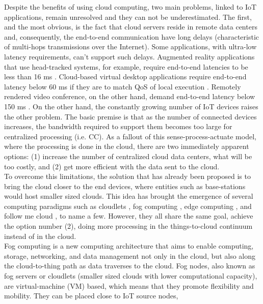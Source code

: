 \noindent\tab Despite the benefits of using cloud computing, two main problems, linked to IoT applications, remain unresolved and they can not be underestimated. The first, and the most obvious, is the fact that cloud servers reside in remote data centers and, consequently, the end-to-end communication have long delays (characteristic of multi-hops transmissions over the Internet). Some applications, with ultra-low latency requirements, can't support such delays. Augmented reality applications that use head-tracked systems, for example, require end-to-end latencies to be less than 16 ms \cite{ellis2004generalizeability}. Cloud-based virtual desktop applications require end-to-end latency below 60 ms if they are to match QoS of local execution \cite{taylor2015virtual}. Remotely rendered video conference, on the other hand, demand end-to-end latency below 150 ms \cite{szigeti2005end}. On the other hand, the constantly growing number of IoT devices raises the other problem. The basic premise is that as the number of connected devices increases, the bandwidth required to support them becomes too large for centralized processing (i.e. CC). As a fallout of this sense-process-actuate model, where the processing is done in the cloud, there are two immediately apparent options: (1) increase the number of centralized cloud data centers, what will be too costly, and (2) get more efficient with the data sent to the cloud.\\
\noindent\tab To overcome this limitations, the solution that has already been proposed is to bring the cloud closer to the end devices, where entities such as base-stations would host smaller sized clouds. This idea has brought the emergence of several computing paradigms such as cloudlets \cite{satyanarayanan2013cloudlets}, fog computing \cite{bonomi2012fog}, edge computing \cite{davy2014challenges}, and follow me cloud \cite{taleb2013follow}, to name a few. However, they all share the same goal, achieve the option number (2), doing more processing in the things-to-cloud continuum instead of in the cloud.\\
\noindent\tab Fog computing is a new computing architecture that aims to enable
computing, storage, networking, and data management not only in the cloud, but
also along the cloud-to-thing path as data traverses to the cloud. Fog nodes,
also known as fog servers or cloudlets (smaller sized clouds with lower
computational capacity), are virtual-machine (VM) based, which means that they
promote flexibility and mobility. They can be placed close to IoT source nodes,
